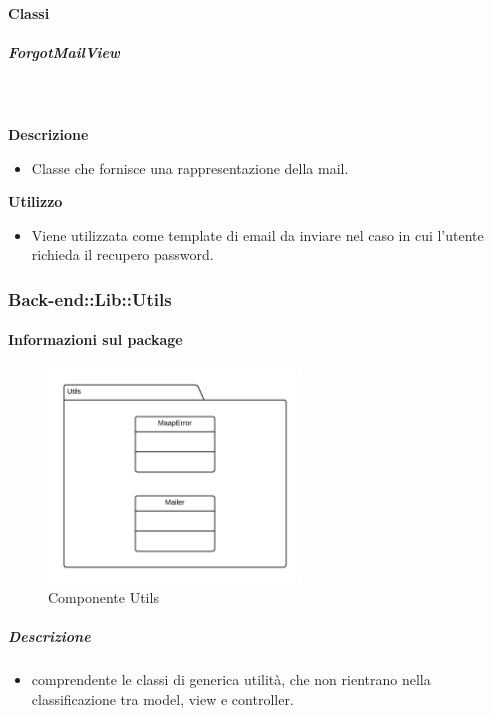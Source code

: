 		\paragraph{Classi}
			\subparagraph{ForgotMailView}
				
				\textbf{\\ \\ Descrizione} 
					\begin{itemize}
						\item[] Classe che fornisce una rappresentazione della mail.
					\end{itemize}      
				\textbf{Utilizzo}  
					\begin{itemize}
						\item[] Viene utilizzata come template di email da inviare nel caso in cui l'utente richieda il recupero password.
					\end{itemize}
	\subsubsection{Back-end::Lib::Utils}
	\paragraph{Informazioni sul package} 
		\begin{figure}[H] 
			\begin{center} 
				\includegraphics[width=0.6\textwidth]{uml/package/Back-end::Lib::Utils.png}  
				\caption{Componente Utils}
			\end{center}  
		\end{figure} 
	\subparagraph{Descrizione} 
		\begin{itemize}
		\item[]  comprendente le classi di generica utilità, che non rientrano nella classificazione tra model, view e controller.
		\end{itemize} 
